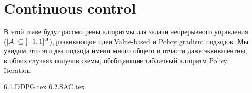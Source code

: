 \chapter{Continuous control}\label{continuouscontrolchapter}

В этой главе будут рассмотрены алгоритмы для задачи непрерывного управления ($|\mathcal{A}| \subseteq [-1, 1]^A$), развивающие идеи Value-based и Policy gradient подходов. Мы увидим, что эти два подхода имеют много общего и отчасти даже эквивалентны, в обоих случаях получив схемы, обобщающие табличный алгоритм Policy Iteration.

{6.1.DDPG.tex}
{6.2.SAC.tex}